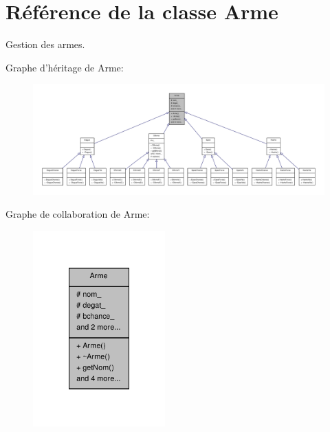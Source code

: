 \hypertarget{class_arme}{\section{Référence de la classe Arme}
\label{class_arme}
}


Gestion des armes.  




Graphe d'héritage de Arme\-:
\nopagebreak
\begin{figure}[H]
\begin{center}
\leavevmode
\includegraphics[width=350pt]{class_arme__inherit__graph}
\end{center}
\end{figure}


Graphe de collaboration de Arme\-:
\nopagebreak
\begin{figure}[H]
\begin{center}
\leavevmode
\includegraphics[width=144pt]{class_arme__coll__graph}
\end{center}
\end{figure}
